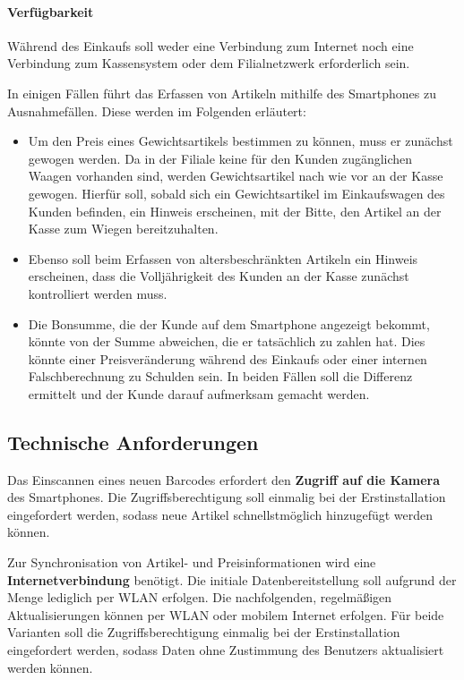 \paragraph{Verfügbarkeit}
Während des Einkaufs soll weder eine Verbindung zum Internet noch eine Verbindung zum Kassensystem oder dem Filialnetzwerk erforderlich sein. 

In einigen Fällen führt das Erfassen von Artikeln mithilfe des Smartphones zu Ausnahmefällen. Diese werden im Folgenden erläutert:

\begin{itemize}
	\item Um den Preis eines Gewichtsartikels bestimmen zu können, muss er zunächst gewogen werden. Da in der Filiale keine für den Kunden zugänglichen Waagen vorhanden sind, werden Gewichtsartikel nach wie vor an der Kasse gewogen. Hierfür soll, sobald sich ein Gewichtsartikel im Einkaufswagen des Kunden befinden, ein Hinweis erscheinen, mit der Bitte, den Artikel an der Kasse zum Wiegen bereitzuhalten.
	\item Ebenso soll beim Erfassen von altersbeschränkten Artikeln ein Hinweis erscheinen, dass die Volljährigkeit des Kunden an der Kasse zunächst kontrolliert werden muss.
	\item Die Bonsumme, die der Kunde auf dem Smartphone angezeigt bekommt, könnte von der Summe abweichen, die er tatsächlich zu zahlen hat. Dies könnte einer Preisveränderung während des Einkaufs oder einer internen Falschberechnung zu Schulden sein. In beiden Fällen soll die Differenz ermittelt und der Kunde darauf aufmerksam gemacht werden.
\end{itemize}

\subsection{Technische Anforderungen}
Das Einscannen eines neuen Barcodes erfordert den \textbf{Zugriff auf die Kamera} des Smartphones. Die Zugriffsberechtigung soll einmalig bei der Erstinstallation eingefordert werden, sodass neue Artikel schnellstmöglich hinzugefügt werden können.

Zur Synchronisation von Artikel- und Preisinformationen wird eine \textbf{Internetverbindung} benötigt. Die initiale Datenbereitstellung soll aufgrund der Menge lediglich per WLAN erfolgen. Die nachfolgenden, regelmäßigen Aktualisierungen können per WLAN oder mobilem Internet erfolgen. Für beide Varianten soll die Zugriffsberechtigung einmalig bei der Erstinstallation eingefordert werden, sodass Daten ohne Zustimmung des Benutzers aktualisiert werden können.


